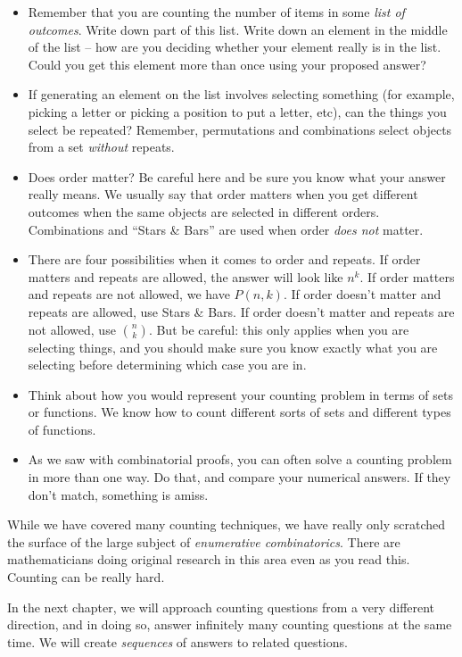 \documentclass[12pt]{article}
\begin{document}
\begin{itemize}
\item Remember that you are counting the number of items in some \emph{list of outcomes}.  Write down part of this list.  Write down an element in the middle of the list -- how are you deciding whether your element really is in the list.  Could you get this element more than once using your proposed answer?
\item If generating an element on the list involves selecting something (for example, picking a letter or picking a position to put a letter, etc), can the things you select be repeated?  Remember, permutations and combinations select objects from a set \emph{without} repeats.
\item Does order matter?  Be careful here and be sure you know what your answer really means.  We usually say that order matters when you get different outcomes when the same objects are selected in different orders.  Combinations and ``Stars \& Bars'' are used when order {\em does not} matter.
\item There are four possibilities when it comes to order and repeats.  If order matters and repeats are allowed, the answer will look like $n^k$.  If order matters and repeats are not allowed, we have $P(n,k)$.  If order doesn't matter and repeats are allowed, use Stars \& Bars.  If order doesn't matter and repeats are not allowed, use ${n\choose k}$.  But be careful: this only applies when you are selecting things, and you should make sure you know exactly what you are selecting before determining which case you are in.
\item Think about how you would represent your counting problem in terms of sets or functions.  We know how to count different sorts of sets and different types of functions.  %

\item As we saw with combinatorial proofs, you can often solve a counting problem in more than one way.  Do that, and compare your numerical answers.  If they don't match, something is amiss.
\end{itemize}

While we have covered many counting techniques, we have really only scratched the surface of the large subject of \emph{enumerative combinatorics}.  There are mathematicians doing original research in this area even as you read this.  Counting can be really hard.

In the next chapter, we will approach counting questions from a very different direction, and in doing so, answer infinitely many counting questions at the same time.  We will create \emph{sequences} of answers to related questions.  
 
\end{document}
